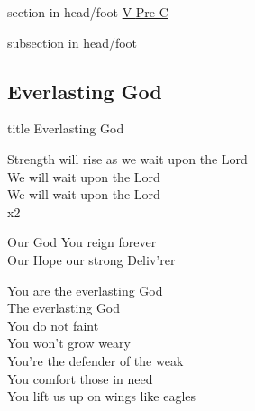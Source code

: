 \documentclass[aspectratio=169]{beamer}
\begin{document}
{
{ 
 {
 \begin{beamercolorbox}[ht=4.5ex,dp=1.5ex,%
      leftskip=.3cm,rightskip=.3cm plus1fil]{section in head/foot}
 \fontsize{12}{25}\selectfont 
\hyperlink{Everlasting God['Strength will rise']V}{V  }\hyperlink{Everlasting God['Strength will rise']Pre}{Pre  }\hyperlink{Everlasting God['Strength will rise']C}{C  } 
 \end{beamercolorbox}%
  \begin{beamercolorbox}[ht=2.5ex,dp=1.125ex,%
   leftskip=.3cm,rightskip=.3cm plus1fil]{subsection in head/foot}
   \insertauthor
 \end{beamercolorbox}%
 }
}
\subsection{Everlasting God}
\hypertarget{Everlasting God['Strength will rise']}{}
\begin{frame}{}
 \vfill
  \centering
  \begin{beamercolorbox}[sep=8pt,center,shadow=true,rounded=true]{title}
    Everlasting God     
  \end{beamercolorbox}
  \vfill
\end{frame}

\hypertarget{Everlasting God['Strength will rise']V}{}
\begin{frame}{}
\fontsize{20.930232558139537}{25.116279069767444}\selectfont

Strength will rise as we wait upon the Lord\\ 
We will wait upon the Lord\\ 
We will wait upon the Lord\\ 
x2

\end{frame}
\hypertarget{Everlasting God['Strength will rise']Pre}{}
\begin{frame}{}
\fontsize{20.930232558139537}{25.116279069767444}\selectfont

Our God You reign forever\\ 
Our Hope our strong Deliv'rer

\end{frame}
\hypertarget{Everlasting God['Strength will rise']C}{}
\begin{frame}{}
\fontsize{20.930232558139537}{25.116279069767444}\selectfont

You are the everlasting God\\ 
The everlasting God\\ 
You do not faint\\ 
You won't grow weary\\ 
You're the defender of the weak\\ 
You comfort those in need\\ 
You lift us up on wings like eagles

\end{frame}
}
\end{document}
